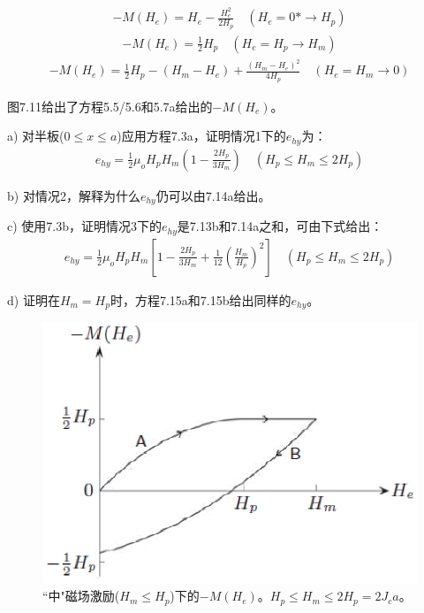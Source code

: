 \begin{align*}%
-M(H_e)=H_e-\frac{H_{e}^{2}}{2H_p}    \quad  (H_e=0*\rightarrow H_p) \tag{5.5}
\end{align*}
\begin{align*}
-M(H_e)=\frac{1}{2}H_p      \quad  (H_e=H_p\rightarrow H_m) \tag{5.6}
\end{align*}
\begin{align*}
-M(H_e)=\frac{1}{2}H_p-(H_m-H_e)+\frac{(H_m-H_e)^2}{4H_p} \quad   (H_e=H_m\rightarrow 0)\tag{5.7a}
\end{align*}

图7.11给出了方程5.5/5.6和5.7a给出的$−M(H_e)$。

a) 对半板($0\le x\le a$)应用方程7.3a，证明情况1下的$e_{hy}$为：
\begin{align*}%
e_{hy}=\frac{1}{2}\mu_oH_pH_m\left(1-\frac{2H_p}{3H_m}\right)\quad   (H_p\leq H_m\leq 2H_p)\tag{7.13b}
\end{align*}

b) 对情况2，解释为什么$e_{hy}$仍可以由7.14a给出。

c) 使用7.3b，证明情况3下的$e_{hy}$是7.13b和7.14a之和，可由下式给出：
\begin{align*}%
e_{hy}=\frac{1}{2}\mu_oH_pH_m\left[1-\frac{2H_p}{3H_m}+\frac{1}{12}\left(\frac{H_m}{H_p}\right)^2\right]     \quad (H_p\leq H_m \leq 2H_p) \tag{7.15b}
\end{align*}

d) 证明在$H_m=H_p$时，方程7.15a和7.15b给出同样的$e_{hy}$。

\begin{figure}[htbp]
	\centering
	\includegraphics[scale=0.7]{chpt7/figs/fig7.11.eps}
	\caption{``中"磁场激励($H_m\le H_p$)下的$-M(H_e)$。$H_p\le H_m\le 2H_p=2J_c a$。}
\end{figure}


